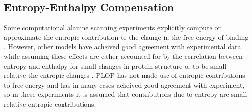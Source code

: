 
\subsection{Entropy-Enthalpy Compensation}
Some computational alanine scanning experiments explicitly compute or approximate the entropic contribution to the change in the free energy of binding \cite{hao2010computational,guerois2002predicting}. 
However, other models have acheived good agreement with experimental data while assuming these effects are either accounted for by the correlation between entropy and enthalpy for small changes in protein structure \cite{sharp2001entropy} or to be small relative the entropic changes \cite{kortemme2004computational}.
PLOP has not made use of entropic contributions to free energy and has in many cases acheived good agreement with experiment, so in these experiments it is assumed that contributions due to entropy are small relative entropic contributions.

